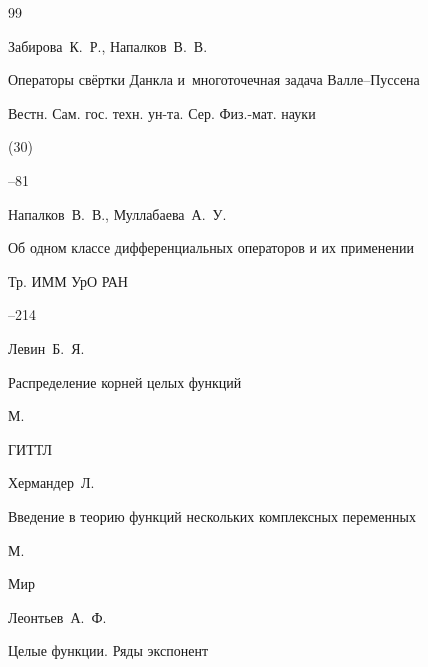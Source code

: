 \begin{thebibliography}{99}

\by Забирова~К.~Р., Напалков~В.~В.

\paper Операторы свёртки Данкла и~многоточечная задача Валле--Пуссена

\jour Вестн. Сам. гос. техн. ун-та. Сер. Физ.-мат. науки


(30)

--81








\by Напалков~В.~В., Муллабаева~А.~У.

\paper Об одном классе дифференциальных операторов и их применении

\serial Тр. ИММ УрО РАН




--214







\by Левин~Б.~Я.

\book Распределение корней целых функций

\publaddr М.

\publ ГИТТЛ



 


\by Хермандер~Л.

\book Введение в теорию функций нескольких комплексных переменных

\publaddr М.

\publ Мир







\by Леонтьев~А.~Ф.

\book  Целые функции. Ряды экспонент


\end{thebibliography}
